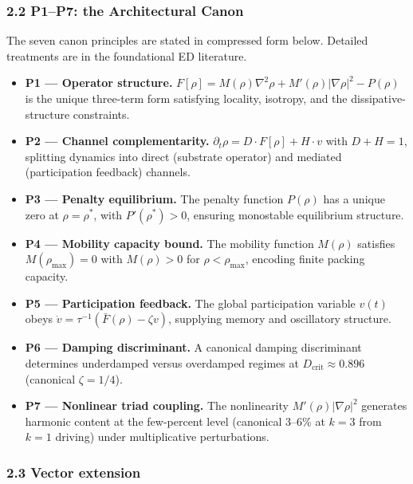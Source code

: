 \documentclass[
]{article}
\providecommand{\tightlist}{%
  \setlength{\itemsep}{0pt}\setlength{\parskip}{0pt}}
\begin{document}
\subsubsection{2.2 P1--P7: the Architectural
Canon}\label{p1p7-the-architectural-canon}

The seven canon principles are stated in compressed form below. Detailed
treatments are in the foundational ED literature.

\begin{itemize}
\tightlist
\item
  \textbf{P1 --- Operator structure.}
  \(F[\rho] = M(\rho)\nabla^2\rho + M'(\rho)|\nabla\rho|^2 - P(\rho)\)
  is the unique three-term form satisfying locality, isotropy, and the
  dissipative-structure constraints.
\item
  \textbf{P2 --- Channel complementarity.}
  \(\partial_t\rho = D \cdot F[\rho] + H \cdot v\) with \(D + H = 1\),
  splitting dynamics into direct (substrate operator) and mediated
  (participation feedback) channels.
\item
  \textbf{P3 --- Penalty equilibrium.} The penalty function \(P(\rho)\)
  has a unique zero at \(\rho = \rho^*\), with \(P'(\rho^*) > 0\),
  ensuring monostable equilibrium structure.
\item
  \textbf{P4 --- Mobility capacity bound.} The mobility function
  \(M(\rho)\) satisfies \(M(\rho_\mathrm{max}) = 0\) with
  \(M(\rho) > 0\) for \(\rho < \rho_\mathrm{max}\), encoding finite
  packing capacity.
\item
  \textbf{P5 --- Participation feedback.} The global participation
  variable \(v(t)\) obeys
  \(\dot v = \tau^{-1}(\bar F(\rho) - \zeta v)\), supplying memory and
  oscillatory structure.
\item
  \textbf{P6 --- Damping discriminant.} A canonical damping discriminant
  determines underdamped versus overdamped regimes at
  \(D_\mathrm{crit} \approx 0.896\) (canonical \(\zeta = 1/4\)).
\item
  \textbf{P7 --- Nonlinear triad coupling.} The nonlinearity
  \(M'(\rho)|\nabla\rho|^2\) generates harmonic content at the
  few-percent level (canonical 3--6\% at \(k = 3\) from \(k = 1\)
  driving) under multiplicative perturbations.
\end{itemize}

\subsubsection{2.3 Vector extension}\label{vector-extension}
\end{document}
